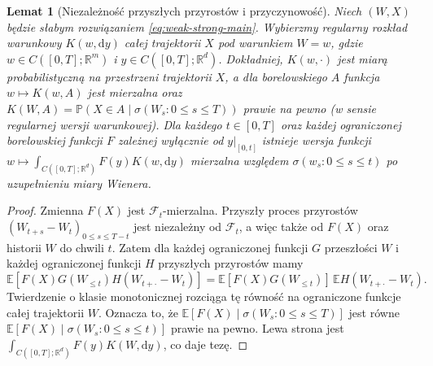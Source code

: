 \documentclass[11pt,a4paper,oneside]{report}
\numberwithin{equation}{chapter}
\theoremstyle{plain}
\newtheorem{lemat}[twierdzenie]{Lemat}
\theoremstyle{definition}
\theoremstyle{remark}
\newcommand{\R}{\mathbb{R}}
\newcommand{\Prob}{\mathbb{P}}
\newcommand{\E}{\mathbb{E}}
\newcommand{\calF}{\mathcal{F}}
\newcommand{\dd}{\mathrm{d}}
\begin{document}
\begin{lemat}[Niezależność przyszłych przyrostów i przyczynowość]\label{lem:volIII:14:01}
\label{lem:YW-causality}
Niech $(W,X)$ będzie słabym rozwiązaniem
\eqref{eq:weak-strong-main}. Wybierzmy regularny rozkład
warunkowy $K(w,\dd y)$ całej trajektorii $X$ pod warunkiem
$W=w$, gdzie $w\in C([0,T];\R^m)$ i
$y\in C([0,T];\R^d)$. Dokładniej,
$K(w,\cdot)$ jest miarą probabilistyczną na przestrzeni
trajektorii $X$, a dla borelowskiego $A$ funkcja
$w\mapsto K(w,A)$ jest mierzalna oraz
$K(W,A)=\Prob(X\in A\mid\sigma(W_s:0\le s\le T))$
prawie na pewno (w sensie regularnej wersji warunkowej). Dla każdego $t\in[0,T]$ oraz
każdej ograniczonej borelowskiej funkcji $F$ zależnej
wyłącznie od $y|_{[0,t]}$ istnieje wersja funkcji
$w\mapsto\int_{C([0,T];\R^d)} F(y)K(w,\dd y)$ mierzalna względem
$\sigma(w_s:0\le s\le t)$ po uzupełnieniu miary Wienera.
\end{lemat}
\begin{proof}
Zmienna $F(X)$ jest $\calF_t$-mierzalna.
Przyszły proces przyrostów $(W_{t+s}-W_t)_{0\le s\le T-t}$
jest niezależny od $\calF_t$, a więc także od $F(X)$
oraz historii $W$ do chwili $t$. Zatem dla każdej ograniczonej
funkcji $G$ przeszłości $W$ i każdej ograniczonej funkcji $H$
przyszłych przyrostów mamy
\[
 \E[F(X)G(W_{\le t})H(W_{t+\cdot}-W_t)]
 =\E[F(X)G(W_{\le t})]\,\E H(W_{t+\cdot}-W_t).
\]
Twierdzenie o klasie monotonicznej rozciąga tę równość
na ograniczone funkcje całej trajektorii $W$. Oznacza to,
że $\E[F(X)\mid\sigma(W_s:0\le s\le T)]$ jest równe
$\E[F(X)\mid\sigma(W_s:0\le s\le t)]$ prawie na pewno.
Lewa strona jest $\int_{C([0,T];\R^d)} F(y)K(W,\dd y)$, co daje tezę.
\end{proof}
\end{document}
